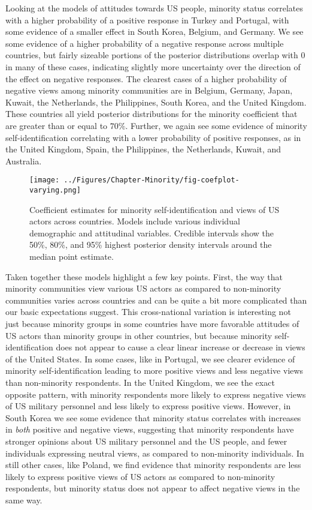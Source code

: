 Looking at the models of attitudes towards US people, minority status correlates with a higher probability of a positive response in Turkey and Portugal, with some evidence of a smaller effect in South Korea, Belgium, and Germany. We see some evidence of a higher probability of a negative response across multiple countries, but fairly sizeable portions of the posterior distributions overlap with 0 in many of these cases, indicating slightly more uncertainty over the direction of the effect on negative responses. The clearest cases of a higher probability of negative views among minority communities are in Belgium, Germany, Japan, Kuwait, the Netherlands, the Philippines, South Korea, and the United Kingdom. These countries all yield posterior distributions for the minority coefficient that are greater than or equal to $70\%$.  Further, we again see some evidence of minority self-identification correlating with a lower probability of positive responses, as in the United Kingdom, Spain, the Philippines, the Netherlands, Kuwait, and Australia.

\begin{figure}[t]
	\texttt{[image: ../Figures/Chapter-Minority/fig-coefplot-varying.png]}
	\caption{Coefficient estimates for minority self-identification and views of US actors across countries. Models include various individual demographic and attitudinal variables. Credible intervals show the 50\%, 80\%, and 95\% highest posterior density intervals around the median point estimate.}
	\label{fig:minoritycoefvarying}
\end{figure}


Taken together these models highlight a few key points. First, the way that minority communities view various US actors as compared to non-minority communities varies across countries and can be quite a bit more complicated than our basic expectations suggest. This cross-national variation is interesting not just because minority groups in some countries have more favorable attitudes of US actors than minority groups in other countries, but because minority self-identification does not appear to cause a clear linear increase or decrease in views of the United States. In some cases, like in Portugal, we see clearer evidence of minority self-identification leading to more positive views and less negative views than non-minority respondents. In the United Kingdom, we see the exact opposite pattern, with minority respondents more likely to express negative views of US military personnel and less likely to express positive views. However, in South Korea we see some evidence that minority status correlates with increases in \textit{both} positive and negative views, suggesting that minority respondents have stronger opinions about US military personnel and the US people, and fewer individuals expressing neutral views, as compared to non-minority individuals. In still other cases, like Poland, we find evidence that minority respondents are less likely to express positive views of US actors as compared to non-minority respondents, but minority status does not appear to affect negative views in the same way. 


